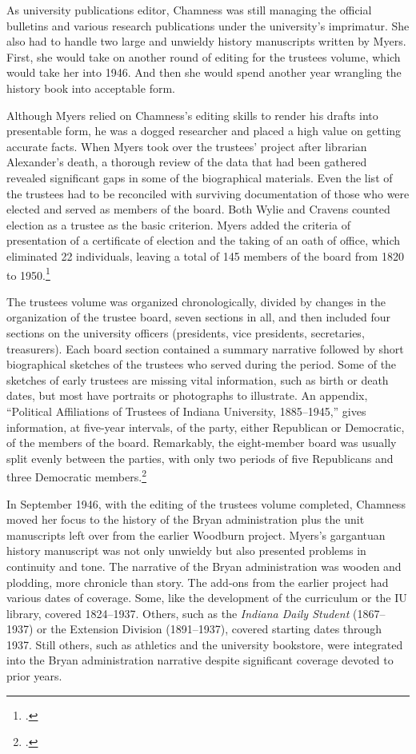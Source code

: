 \documentclass[
  american,
  letterpaper,
]{scrreprt}
\begin{document}
As university publications editor, Chamness was still managing the
official bulletins and various research publications under the
university's imprimatur. She also had to handle two large and unwieldy
history manuscripts written by Myers. First, she would take on another
round of editing for the trustees volume, which would take her into
1946. And then she would spend another year wrangling the history book
into acceptable form.

Although Myers relied on Chamness's editing skills to render his drafts
into presentable form, he was a dogged researcher and placed a high
value on getting accurate facts. When Myers took over the trustees'
project after librarian Alexander's death, a thorough review of the data
that had been gathered revealed significant gaps in some of the
biographical materials. Even the list of the trustees had to be
reconciled with surviving documentation of those who were elected and
served as members of the board. Both Wylie and Cravens counted election
as a trustee as the basic criterion. Myers added the criteria of
presentation of a certificate of election and the taking of an oath of
office, which eliminated 22 individuals, leaving a total of 145 members
of the board from 1820 to 1950.\footnote{.}

The trustees volume was organized chronologically, divided by changes in
the organization of the trustee board, seven sections in all, and then
included four sections on the university officers (presidents, vice
presidents, secretaries, treasurers). Each board section contained a
summary narrative followed by short biographical sketches of the
trustees who served during the period. Some of the sketches of early
trustees are missing vital information, such as birth or death dates,
but most have portraits or photographs to illustrate. An appendix,
``Political Affiliations of Trustees of Indiana University,
1885--1945,'' gives information, at five-year intervals, of the party,
either Republican or Democratic, of the members of the board.
Remarkably, the eight-member board was usually split evenly between the
parties, with only two periods of five Republicans and three Democratic
members.\footnote{.}

In September 1946, with the editing of the trustees volume completed,
Chamness moved her focus to the history of the Bryan administration plus
the unit manuscripts left over from the earlier Woodburn project.
Myers's gargantuan history manuscript was not only unwieldy but also
presented problems in continuity and tone. The narrative of the Bryan
administration was wooden and plodding, more chronicle than story. The
add-ons from the earlier project had various dates of coverage. Some,
like the development of the curriculum or the IU library, covered
1824--1937. Others, such as the \emph{Indiana Daily Student}
(1867--1937) or the Extension Division (1891--1937), covered starting
dates through 1937. Still others, such as athletics and the university
bookstore, were integrated into the Bryan administration narrative
despite significant coverage devoted to prior years.
\end{document}
